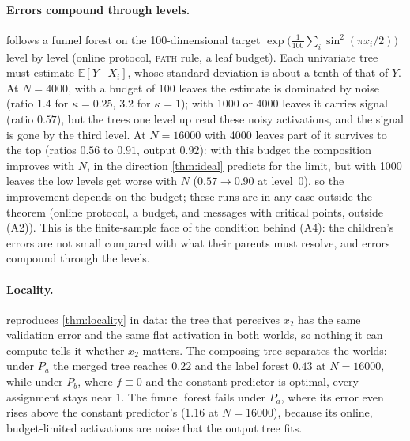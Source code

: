 \documentclass[11pt]{article}
\theoremstyle{definition}
\theoremstyle{remark}
\newcommand{\E}{\mathbb{E}}
\begin{document}
\paragraph{Errors compound through levels.}   follows a funnel forest on the 100-dimensional target $\exp\bigl(\tfrac1{100}\sum_i\sin^2(\pi x_i/2)\bigr)$ level by level (online protocol, \textsc{path} rule, a leaf budget).  Each univariate tree must estimate
$\E[Y\mid X_i]$, whose standard deviation is about a tenth of that of $Y$.  At $N=4000$, with a budget
of 100 leaves the estimate is dominated by noise (ratio $1.4$ for $\kappa=0.25$, $3.2$ for
$\kappa=1$); with 1000 or 4000 leaves it carries signal (ratio $0.57$), but the trees one
level up read these noisy activations, and the signal is gone by the third level.  At $N=16000$ with 4000 leaves part of
it survives to the top (ratios $0.56$ to $0.91$, output $0.92$): with this budget the composition improves with $N$, in the direction \cref{thm:ideal}
predicts for the limit, but with 1000 leaves the low levels get worse with $N$ ($0.57\to0.90$
at level~0), so the improvement depends on the budget; these runs are in any case outside
the theorem (online protocol, a budget, and messages with critical points, outside (A2)).  This is the finite-sample face of the
condition behind (A4): the children's errors are not small compared with what their
parents must resolve, and errors compound through the levels.

\begin{table}[t]
\centering\small

\caption{The two sign worlds of \cref{thm:locality} (five seeds).  Left: a tree that
perceives $x_2$ and predicts $Y$---its validation RMSE equals that of the constant
predictor ($1.00$) and its activation is flat in both worlds.  Right: the composing
tree's test RMSE for four task assignments.}
\label{tab:locality}
\end{table}

\paragraph{Locality.}
 reproduces \cref{thm:locality} in data: the tree that perceives $x_2$
has the same validation error and the same flat activation in both worlds, so nothing
it can compute tells it whether $x_2$ matters.  The composing tree separates the worlds:
under $P_a$ the merged tree reaches $0.22$ and the label forest $0.43$ at $N=16000$, while
under $P_b$, where $f\equiv0$ and the constant predictor is optimal, every assignment
stays near $1$.  The funnel forest fails under $P_a$, where its error even rises above the constant predictor's ($1.16$ at $N=16000$), because
its online, budget-limited activations are noise that the output tree fits.
\end{document}
